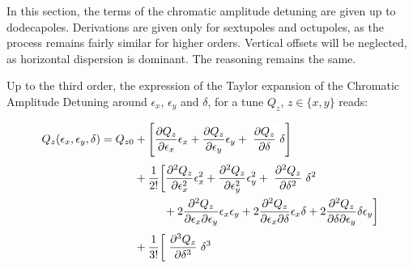 In this section, the terms of the chromatic amplitude detuning are given up to dodecapoles.
Derivations are given only for sextupoles and octupoles, as the process remains fairly similar for
higher orders.
Vertical offsets will be neglected, as horizontal dispersion is dominant. The reasoning remains the 
same.

Up to the third order, the expression of the Taylor expansion of the Chromatic Amplitude Detuning
around $\epsilon_x$, $\epsilon_y$ and $\delta$, for a tune $Q_z$, $z \in \{x, y\}$ reads:

\begin{equation}
\begin{aligned}
Q_z(\epsilon_x, \epsilon_y, \delta) = Q_{z0} &+ \left[\frac{\partial Q_z}{\partial \epsilon_x} \epsilon_x
                                                 + \frac{\partial Q_z}{\partial \epsilon_y} \epsilon_y
                                                 + \colorbox{yellow!0}{$\displaystyle \frac{\partial Q_z}{\partial \delta}$} \delta
                                                \right] \\
                                             &+ \frac{1}{2!} \biggl[\frac{\partial^2Q_z}{\partial \epsilon_x^2}\epsilon_x^2 
                                                 + \frac{\partial^2Q_z}{\partial \epsilon_y^2}\epsilon_y^2
                                                 + \colorbox{yellow!0}{$\displaystyle \frac{\partial^2 Q_z}{\partial \delta^2}$} \delta^2  \\
                                             &\;\begin{aligned}
                                             \phantom{+ \frac{1}{2!} \biggl[}
                                               &+ 2 \frac{\partial^2Q_z}{\partial \epsilon_x \partial \epsilon_y}\epsilon_x \epsilon_y
                                                  + 2 \frac{\partial^2Q_z}{\partial \epsilon_x \partial \delta}\epsilon_x \delta
                                                  + 2 \frac{\partial^2Q_z}{\partial \delta \partial \epsilon_y} \delta \epsilon_y
                                             \biggr] \\
                                             \end{aligned} \\
                                             &+ \frac{1}{3!}
                                             \biggl[
                                                  \colorbox{yellow!0}{$\displaystyle \frac{\partial^3 Q_z}{\partial \delta^3}$}\delta^{3}

\end{aligned}
\end{equation}
